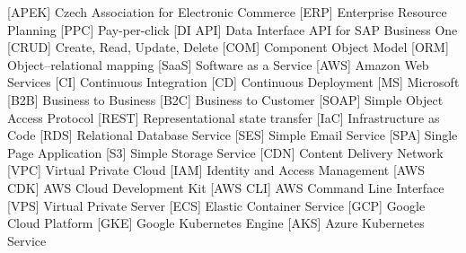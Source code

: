 \documentclass[12pt,a4paper]{report}
\begin{document}



\tableofcontents
















\listoffigures

\listoftables

\begin{acronym}[ICANN]
     [APEK] {Czech Association for Electronic Commerce}
     [ERP] {Enterprise Resource Planning}
     [PPC] {Pay-per-click}
     [DI API] {Data Interface API for SAP Business One}
     [CRUD] {Create, Read, Update, Delete}
     [COM] {Component Object Model}
     [ORM] {Object–relational mapping}
     [SaaS] {Software as a Service}
     [AWS] {Amazon Web Services}
     [CI] {Continuous Integration}
     [CD] {Continuous Deployment}
     [MS] {Microsoft}
     [B2B] {Business to Business}
     [B2C] {Business to Customer}
     [SOAP] {Simple Object Access Protocol}
     [REST] {Representational state transfer}
     [IaC] {Infrastructure as Code}
     [RDS] {Relational Database Service}
     [SES] {Simple Email Service}
     [SPA] {Single Page Application}
     [S3] {Simple Storage Service}
     [CDN] {Content Delivery Network}
     [VPC] {Virtual Private Cloud}
     [IAM] {Identity and Access Management}
     [AWS CDK] {AWS Cloud Development Kit}
     [AWS CLI] {AWS Command Line Interface}
     [VPS] {Virtual Private Server}
     [ECS] {Elastic Container Service}
     [GCP] {Google Cloud Platform}
     [GKE] {Google Kubernetes Engine}
     [AKS] {Azure Kubernetes Service}
\end{acronym}
\end{document}
